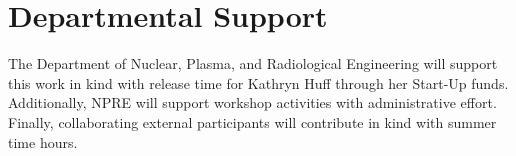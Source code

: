 \documentclass[11pt]{article}
\begin{document}
          \section{Departmental Support}
          The Department of Nuclear, Plasma, and Radiological Engineering will 
          support this work in kind with release time for Kathryn Huff through 
          her Start-Up funds.  Additionally, NPRE will support workshop activities 
          with administrative effort. Finally, collaborating external 
          participants will contribute in kind with summer time hours.


          
          


          
\end{document}
